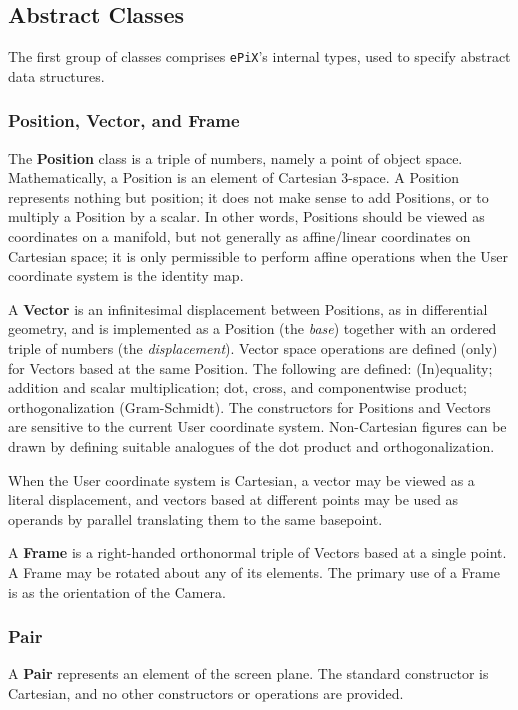 \documentclass[12pt]{article}
\newcommand{\Class}[1]{\textbf{#1}}
\newcommand{\Program}[1]{\texttt{#1}}
\newcommand{\ePiX}{\Program{ePiX}}
\begin{document}
\subsection{Abstract Classes}

The first group of classes comprises \ePiX's internal types, used to
specify abstract data structures.

\subsubsection*{Position, Vector, and Frame}

The \Class{Position} class is a triple of numbers, namely a point of
object space. Mathematically, a Position is an element of Cartesian
3-space. A Position represents nothing but position; it does not make
sense to add Positions, or to multiply a Position by a scalar. In
other words, Positions should be viewed as coordinates on a manifold,
but not generally as affine/linear coordinates on Cartesian space; it
is only permissible to perform affine operations when the User
coordinate system is the identity map.

A \Class{Vector} is an infinitesimal displacement between Positions,
as in differential geometry, and is implemented as a Position (the
\emph{base}) together with an ordered triple of numbers (the
\emph{displacement}). Vector space operations are defined (only) for
Vectors based at the same Position. The following are defined:
(In)equality; addition and scalar multiplication; dot, cross, and
componentwise product; orthogonalization (Gram-Schmidt). The
constructors for Positions and Vectors are sensitive to the current
User coordinate system.  Non-Cartesian figures can be drawn by
defining suitable analogues of the dot product and orthogonalization.

When the User coordinate system is Cartesian, a vector may be viewed
as a literal displacement, and vectors based at different points may
be used as operands by parallel translating them to the same
basepoint.

A \Class{Frame} is a right-handed orthonormal triple of Vectors based
at a single point. A Frame may be rotated about any of its elements.
The primary use of a Frame is as the orientation of the Camera.

\subsubsection*{Pair}

A \Class{Pair} represents an element of the screen plane. The standard
constructor is Cartesian, and no other constructors or operations are
provided. 
\end{document}
